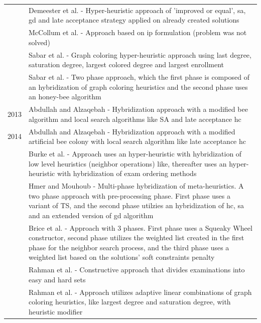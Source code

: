 \begin{table}
\begin{tabular}{@{\,}r <{\hskip 2pt} !{\foo} >{\raggedright\arraybackslash}p{15cm}}
		& Demeester et al. - Hyper-heuristic approach of 'improved or equal', \gls{sa}, \gls{gd} and late acceptance strategy applied on already created solutions\\
		& McCollum et al. - Approach based on \gls{ip} formulation (problem was not solved)\\
		& Sabar et al. - Graph coloring hyper-heuristic approach using last degree, saturation degree, largest colored degree and largest enrollment\\
		& Sabar et al. - Two phase approach, which the first phase is composed of an hybridization of graph coloring heuristics and the second phase uses an honey-bee algorithm\\
2013	& Abdullah and Alzaqebah - Hybridization approach with a modified bee algorithm and local search algorithms like SA and late acceptance \gls{hc}\\
2014	& Abdullah and Alzaqebah - Hybridization approach with a modified artificial bee colony with local search algorithm like late acceptance \gls{hc}\\
		& Burke et al. - Approach uses an hyper-heuristic with hybridization of low level heuristics (neighbor operations) like, thereafter uses an hyper-heuristic with hybridization of exam ordering methods\\
		& Hmer and Mouhoub - Multi-phase hybridization of meta-heuristics. A two phase approach with pre-processing phase. First phase uses a variant of TS, and the second phase utilzies an hybridization of \gls{hc}, \gls{sa} and an extended version of \gls{gd} algorithm\\
		& Brice et al. - Approach with 3 phases. First phase uses a Squeaky Wheel constructor, second phase utilizes the weighted list created in the first phase for the neighbor search process, and the third phase uses a weighted list based on the solutions' soft constraints penalty\\
		& Rahman et al. - Constructive approach that divides examinations into easy and hard sets\\
		& Rahman et al. - Approach utilizes adaptive linear combinations of graph coloring heuristics, like largest degree and saturation degree, with heuristic modifier\\
		
\end{tabular}
\end{table}
